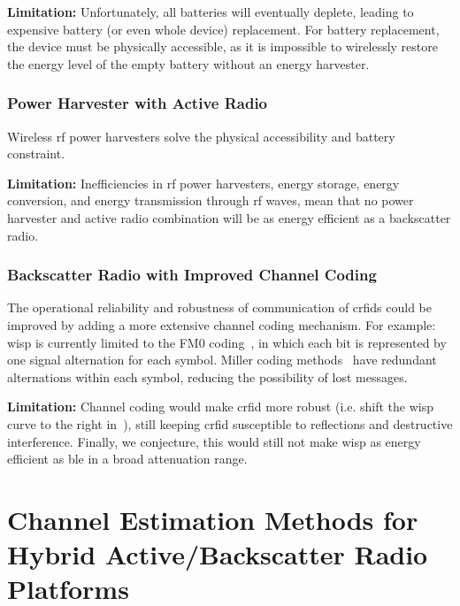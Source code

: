 \documentclass[conference,letterpaper,twoside,final,10pt]{IEEEtran}
\begin{document}
\textbf{Limitation:}
Unfortunately, all batteries will eventually deplete, leading to expensive battery (or even whole device) replacement.
For battery replacement, the device must be physically accessible, as it is impossible to wirelessly restore the energy level of the empty battery without an energy harvester.

\subsubsection{Power Harvester with Active Radio}
\label{sec:alternatives/harvester}

Wireless \ac{rf} power harvesters solve the physical accessibility and battery constraint.

\textbf{Limitation:}
Inefficiencies in \ac{rf} power harvesters, energy storage, energy conversion, and energy transmission through \ac{rf} waves, mean that no power harvester and active radio combination will be as energy efficient as a backscatter radio.

\subsubsection{Backscatter Radio with Improved Channel Coding}
\label{sec:alternatives/coding}

The operational reliability and robustness of communication of \acp{crfid} could be improved by adding a more extensive channel coding mechanism.
For example: \ac{wisp} is currently limited to the FM0 coding~\cite[Sec. 6.3.1.3.2.1]{epcglobal2013gen2}, in which each bit is represented by one signal alternation for each symbol.
Miller coding methods~\cite[Sec. 6.3.1.3.2.3]{epcglobal2013gen2} have redundant alternations within each symbol, reducing the possibility of lost messages.

\textbf{Limitation:}
Channel coding would make \ac{crfid} more robust (i.e. shift the \ac{wisp} curve to the right in~), still keeping \ac{crfid} susceptible to reflections and destructive interference.
Finally, we conjecture, this would still not make \ac{wisp} as energy efficient as \ac{ble} in a broad attenuation range.

\section{Channel Estimation Methods for Hybrid Active/Backscatter Radio Platforms}
\label{sec:radio-switching}
\label{sec:feedback}
\end{document}
